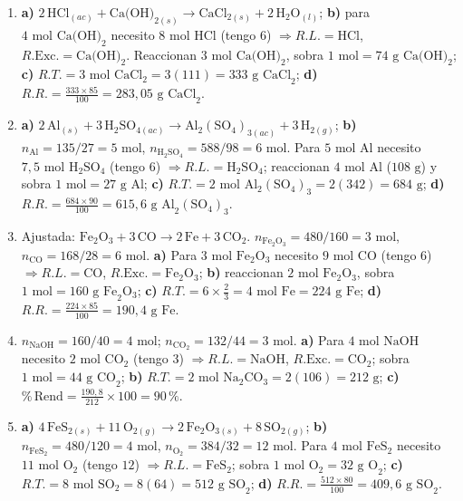 \documentclass[12pt, letterpaper]{article}
\newcommand{\pc}{\text{\%}}
\begin{document}
\begin{enumerate}[leftmargin=*, label=\textbf{\arabic*.}, start=45]
  \item \textbf{a)} $2\,\text{HCl}_{(ac)} + \text{Ca(OH)}_{2(s)} \longrightarrow \text{CaCl}_{2(s)} + 2\,\text{H}_2\text{O}_{(l)}$; \textbf{b)} para $4\text{ mol Ca(OH)}_2$ necesito $8\text{ mol HCl}$ (tengo $6$) $\Rightarrow R.L. = \text{HCl}$, $R.\text{Exc.} = \text{Ca(OH)}_2$. Reaccionan $3\text{ mol Ca(OH)}_2$, sobra $1\text{ mol} = 74\text{ g Ca(OH)}_2$; \textbf{c)} $R.T. = 3\text{ mol CaCl}_2 = 3(111) = 333\text{ g CaCl}_2$; \textbf{d)} $R.R. = \frac{333\times 85}{100} = 283{,}05\text{ g CaCl}_2$.
  \item \textbf{a)} $2\,\text{Al}_{(s)} + 3\,\text{H}_2\text{SO}_{4(ac)} \longrightarrow \text{Al}_2(\text{SO}_4)_{3(ac)} + 3\,\text{H}_{2(g)}$; \textbf{b)} $n_{\text{Al}} = 135/27 = 5\text{ mol}$, $n_{\text{H}_2\text{SO}_4} = 588/98 = 6\text{ mol}$. Para $5\text{ mol Al}$ necesito $7{,}5\text{ mol H}_2\text{SO}_4$ (tengo $6$) $\Rightarrow R.L. = \text{H}_2\text{SO}_4$; reaccionan $4\text{ mol Al}$ ($108\text{ g}$) y sobra $1\text{ mol} = 27\text{ g Al}$; \textbf{c)} $R.T. = 2\text{ mol Al}_2(\text{SO}_4)_3 = 2(342) = 684\text{ g}$; \textbf{d)} $R.R. = \frac{684\times 90}{100} = 615{,}6\text{ g Al}_2(\text{SO}_4)_3$.
  \item Ajustada: $\text{Fe}_2\text{O}_3 + 3\,\text{CO} \longrightarrow 2\,\text{Fe} + 3\,\text{CO}_2$. $n_{\text{Fe}_2\text{O}_3} = 480/160 = 3\text{ mol}$, $n_{\text{CO}} = 168/28 = 6\text{ mol}$. \textbf{a)} Para $3\text{ mol Fe}_2\text{O}_3$ necesito $9\text{ mol CO}$ (tengo $6$) $\Rightarrow R.L. = \text{CO}$, $R.\text{Exc.} = \text{Fe}_2\text{O}_3$; \textbf{b)} reaccionan $2\text{ mol Fe}_2\text{O}_3$, sobra $1\text{ mol} = 160\text{ g Fe}_2\text{O}_3$; \textbf{c)} $R.T. = 6\times\frac{2}{3} = 4\text{ mol Fe} = 224\text{ g Fe}$; \textbf{d)} $R.R. = \frac{224\times 85}{100} = 190{,}4\text{ g Fe}$.
  \item $n_{\text{NaOH}} = 160/40 = 4\text{ mol}$; $n_{\text{CO}_2} = 132/44 = 3\text{ mol}$. \textbf{a)} Para $4\text{ mol NaOH}$ necesito $2\text{ mol CO}_2$ (tengo $3$) $\Rightarrow R.L. = \text{NaOH}$, $R.\text{Exc.} = \text{CO}_2$; sobra $1\text{ mol} = 44\text{ g CO}_2$; \textbf{b)} $R.T. = 2\text{ mol Na}_2\text{CO}_3 = 2(106) = 212\text{ g}$; \textbf{c)} $\pc\,\text{Rend} = \frac{190{,}8}{212}\times 100 = 90\,\pc$.
  \item \textbf{a)} $4\,\text{FeS}_{2(s)} + 11\,\text{O}_{2(g)} \longrightarrow 2\,\text{Fe}_2\text{O}_{3(s)} + 8\,\text{SO}_{2(g)}$; \textbf{b)} $n_{\text{FeS}_2} = 480/120 = 4\text{ mol}$, $n_{\text{O}_2} = 384/32 = 12\text{ mol}$. Para $4\text{ mol FeS}_2$ necesito $11\text{ mol O}_2$ (tengo $12$) $\Rightarrow R.L. = \text{FeS}_2$; sobra $1\text{ mol O}_2 = 32\text{ g O}_2$; \textbf{c)} $R.T. = 8\text{ mol SO}_2 = 8(64) = 512\text{ g SO}_2$; \textbf{d)} $R.R. = \frac{512\times 80}{100} = 409{,}6\text{ g SO}_2$.

\end{enumerate}
\end{document}

